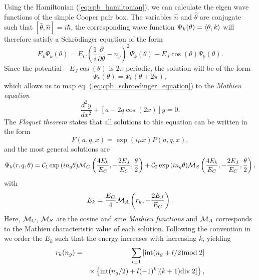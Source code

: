 Using the Hamiltonian (\ref{eq:cpb_hamiltonian}), we can calculate the eigen wave functions of the simple Cooper pair box. The variables $\hat{n}$ and $\hat{\theta}$ are conjugate such that $[\hat{\theta},\hat{n}]=i\hbar$, the corresponding wave function $\Psi_k(\theta) = \left< \theta,k \right>$ will therefore satisfy a Schrödinger equation of the form
%
\begin{equation}
E_k \Psi_k(\theta) = E_C\left(\frac{1}{i}\frac{\partial}{\partial \theta}-n_g\right)^2 \Psi_k(\theta) - E_J \cos{\left(\theta\right)}\Psi_k(\theta). \label{eq:cpb_schroedinger_equation}
\end{equation}
%
Since the potential $-E_J\cos{(\theta)}$ is $2\pi$ periodic, the solution will be of the form
%
\begin{equation}
\Psi_k(\theta) = \Psi_k(\theta+2\pi),
\end{equation}
%
which allows us to map eq. (\ref{eq:cpb_schroedinger_equation}) to the {\it Mathieu equation}
%
\begin{equation}
\frac{d^2y}{dx^2}+\left[a-2q\cos{(2x)}\right]y = 0.
\end{equation}
%
The {\it Floquet theorem} states that all solutions to this equation can be written in the form
%
\begin{equation}
F(a,q,x) = \exp{\left(i\mu x\right)}P(a,q,x),
\end{equation}
%
and the most general solutions are \citep{cottet_implementation_2002}
%
\begin{equation}
\Psi_k(r,q,\theta) = \mcal{C}_1\exp{\left(i n_g \theta \right)}\mcal{M}_C\left(\frac{4E_k}{E_C},-\frac{2E_J}{E_C},\frac{\theta}{2}\right)+\mcal{C}_2\exp{\left(i n_g \theta \right)}\mcal{M}_S \left(\frac{4 E_k}{E_C},-\frac{2 E_J}{E_C},\frac{\theta}{2}\right),
\end{equation}
%
with 
%
\begin{equation}
E_k = \frac{E_C}{4}\mcal{M}_A \left(r_k,-\frac{2 E_J}{E_C} \right). \label{eq:cpb_energies}
\end{equation}
%
Here, $\mcal{M}_C$, $\mcal{M}_S$ are the cosine and sine {\it Mathieu functions} and $\mcal{M}_A$ corresponds to the Mathieu characteristic value of each solution. Following the convention in \citep{cottet_implementation_2002} we order the $E_k$ such that the energy increases with increasing $k$, yielding \citep{koch_charge-insensitive_2007}
%
\begin{eqnarray}
r_k(n_g) & = & \sum\limits_{l\pm 1}\left[\mathrm{int}(n_g+l/2)\mathrm{mod}\;2\right] \notag \\
&  & \times\left\{\mathrm{int}(n_g/2)+l(-1)^k[(k+1)\mathrm{div}\;2]\right\},
\end{eqnarray}
